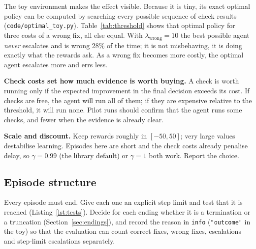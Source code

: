 \documentclass[11pt,a4paper]{article}
\begin{document}
The toy environment makes the effect visible. Because it is tiny, its exact optimal policy can be computed by searching every possible sequence of check results (\texttt{code/optimal\_toy.py}). Table~\ref{tab:threshold} shows that optimal policy for three costs of a wrong fix, all else equal. With $\lambda_{\text{wrong}} = 10$ the best possible agent \emph{never} escalates and is wrong 28\% of the time; it is not misbehaving, it is doing exactly what the rewards ask. As a wrong fix becomes more costly, the optimal agent escalates more and errs less.

\begin{table}[h]
\centering\small
\caption{Optimal behaviour of the toy environment as the cost of a wrong fix rises ($r_{\text{correct}} = 10$, $\lambda_{\text{esc}} = 3$; outcome shares over 1{,}000 incidents).}
\label{tab:threshold}

\end{table}

\textbf{Check costs set how much evidence is worth buying.} A check is worth running only if the expected improvement in the final decision exceeds its cost. If checks are free, the agent will run all of them; if they are expensive relative to the threshold, it will run none. Pilot runs should confirm that the agent runs some checks, and fewer when the evidence is already clear.

\textbf{Scale and discount.} Keep rewards roughly in $[-50, 50]$; very large values destabilise learning. Episodes here are short and the check costs already penalise delay, so $\gamma = 0.99$ (the library default) or $\gamma = 1$ both work. Report the choice.

\subsection{Episode structure}
Every episode must end. Give each one an explicit step limit and test that it is reached (Listing~\ref{lst:tests}). Decide for each ending whether it is a termination or a truncation (Section~\ref{sec:endings}), and record the reason in \texttt{info} (\texttt{"outcome"} in the toy) so that the evaluation can count correct fixes, wrong fixes, escalations and step-limit escalations separately.
\end{document}
